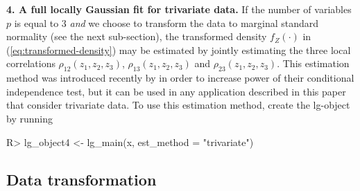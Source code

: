 \textbf{4. A full locally Gaussian fit for trivariate data.} If the number of variables $p$ is equal to $3$ \emph{and} we choose to transform the data to marginal standard normality (see the next sub-section), the transformed density $f_Z(\cdot)$ in (\ref{eq:transformed-density}) may be estimated by jointly estimating the three local correlations $\rho_{12}(z_1, z_2, z_3)$, $\rho_{13}(z_1, z_2, z_3)$ and $\rho_{23}(z_1, z_2, z_3)$. This estimation method was introduced recently by \citet{otne:tjos:2019} in order to increase power of their conditional independence test, but it can be used in any application described in this paper that consider trivariate data. To use this estimation method, create the lg-object by running

\begin{example}
R> lg_object4 <- lg_main(x, est_method = "trivariate")
\end{example}

\subsection{Data transformation}
\label{data-transformation}

